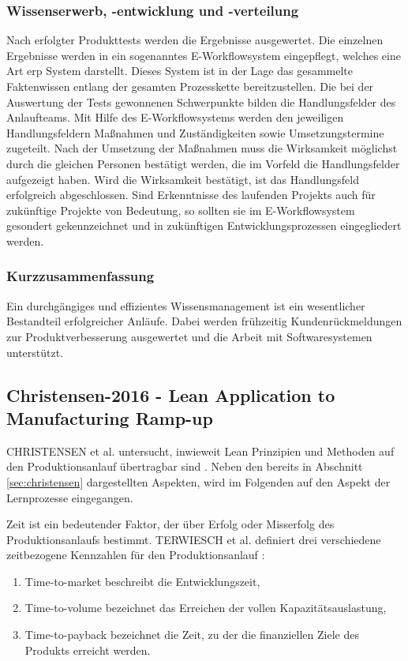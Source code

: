 \subsubsection*{Wissenserwerb, -entwicklung und -verteilung}
Nach erfolgter Produkttests werden die Ergebnisse ausgewertet. Die einzelnen Ergebnisse werden in ein sogenanntes E-Workflowsystem eingepflegt, welches eine Art \gls{erp} System darstellt.
Dieses System ist in der Lage das gesammelte Faktenwissen entlang der gesamten Prozesskette bereitzustellen. Die bei der Auswertung der Tests gewonnenen Schwerpunkte bilden die Handlungsfelder des Anlaufteams. Mit Hilfe des E-Workflowsystems werden den jeweiligen Handlungsfeldern Maßnahmen und Zuständigkeiten sowie Umsetzungstermine zugeteilt. 
Nach der Umsetzung der Maßnahmen muss die Wirksamkeit möglichst durch die gleichen Personen bestätigt werden, die im Vorfeld die Handlungsfelder aufgezeigt haben. Wird die Wirksamkeit bestätigt, ist das Handlungsfeld erfolgreich abgeschlossen. 
Sind Erkenntnisse des laufenden Projekts auch für zukünftige Projekte von Bedeutung, so sollten sie im E-Workflowsystem gesondert gekennzeichnet und in zukünftigen Entwicklungsprozessen eingegliedert werden. 


\subsubsection*{Kurzzusammenfassung}

Ein durchgängiges und effizientes Wissensmanagement ist ein wesentlicher Bestandteil erfolgreicher Anläufe. Dabei werden frühzeitig Kundenrückmeldungen zur Produktverbesserung ausgewertet und die Arbeit mit Softwaresystemen unterstützt. 

\subsection*{Christensen-2016 - Lean Application to Manufacturing Ramp-up}
CHRISTENSEN et al. untersucht, inwieweit Lean Prinzipien und Methoden auf den Produktionsanlauf übertragbar sind \cite{Christensen2016}. Neben den bereits in Abschnitt \ref{sec:christensen} dargestellten Aspekten, wird im Folgenden auf den Aspekt der Lernprozesse eingegangen. 


Zeit ist ein bedeutender Faktor, der über Erfolg oder Misserfolg des Produktionsanlaufs bestimmt. TERWIESCH et al. definiert drei verschiedene zeitbezogene Kennzahlen für den Produktionsanlauf \cite{Terwiesch2001}: 
\begin{enumerate}
 \item Time-to-market beschreibt die Entwicklungszeit,
 \item Time-to-volume bezeichnet das Erreichen der vollen Kapazitätsauslastung,
 \item Time-to-payback bezeichnet die Zeit, zu der die finanziellen Ziele des Produkts erreicht werden. 
\end{enumerate}

